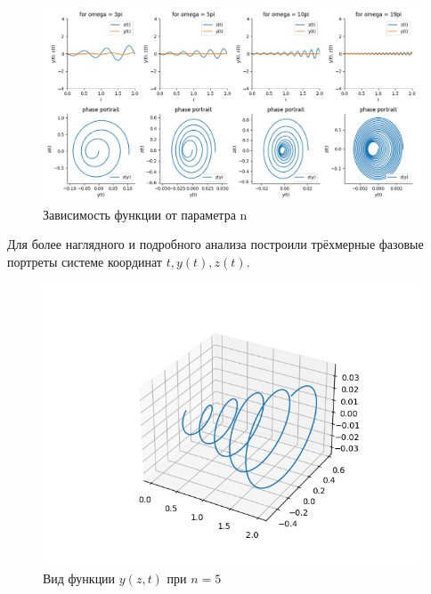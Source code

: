 \documentclass[a4paper,12pt]{article}
\begin{document}
	\begin{figure}[ht!]
		\begin{center}
		\includegraphics[scale=0.5]{figures/Figure_runge1.png}
		\end{center}
		\vspace*{-8mm}
		\caption{Зависимость функции от параметра n}\label{fig:fig5}
  	\end{figure}

	Для более наглядного и подробного анализа построили трёхмерные фазовые 
	портреты системе координат $t, y(t), z(t)$.

	\begin{figure}[ht!]
		\begin{center}
		\includegraphics[scale=0.5]{figures/3d_1.png}
		\end{center}
		\vspace*{-8mm}
		\caption{Вид функции $y(z, t)$ при $n = 5$}\label{fig:fig9}
  	\end{figure}
\end{document}
